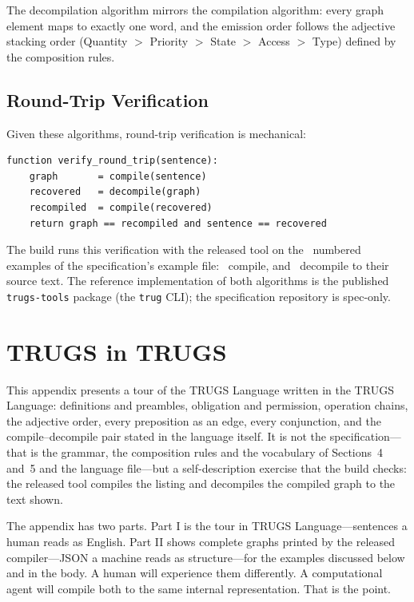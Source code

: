 \documentclass{article}
\begin{document}
The decompilation algorithm mirrors the compilation algorithm: every graph element maps to exactly one word, and the emission order follows the adjective stacking order (Quantity $>$ Priority $>$ State $>$ Access $>$ Type) defined by the composition rules.

\subsection{Round-Trip Verification}

Given these algorithms, round-trip verification is mechanical:

\begin{lstlisting}[style=pseudocode]
function verify_round_trip(sentence):
    graph       = compile(sentence)
    recovered   = decompile(graph)
    recompiled  = compile(recovered)
    return graph == recompiled and sentence == recovered
\end{lstlisting}

The build runs this verification with the released tool on the \ExamplesTotal\ numbered examples of the specification's example file: \ExamplesAccepted\ compile, and \ExamplesRoundTrip\ decompile to their source text. The reference implementation of both algorithms is the published \texttt{trugs-tools} package (the \texttt{trug} CLI); the specification repository is spec-only.

\section{TRUGS in TRUGS}

This appendix presents a tour of the TRUGS Language written in the TRUGS Language: definitions and preambles, obligation and permission, operation chains, the adjective order, every preposition as an edge, every conjunction, and the compile--decompile pair stated in the language itself. It is not the specification---that is the grammar, the composition rules and the vocabulary of Sections~4 and~5 and the language file---but a self-description exercise that the build checks: the released tool compiles the listing and decompiles the compiled graph to the text shown.

The appendix has two parts. Part I is the tour in TRUGS Language---sentences a human reads as English. Part II shows complete graphs printed by the released compiler---JSON a machine reads as structure---for the examples discussed below and in the body. A human will experience them differently. A computational agent will compile both to the same internal representation. That is the point.
\end{document}

